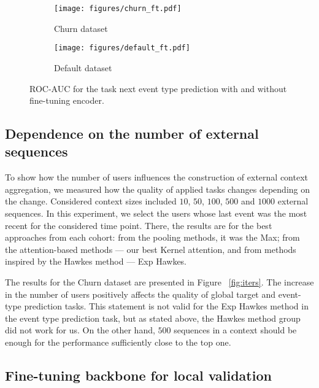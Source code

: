 

\begin{figure*}[!t]
\centering
\begin{subfigure}{.46\textwidth}
  \centering
  \texttt{[image: figures/churn\_ft.pdf]}
  \caption{Churn dataset}
  \label{fig:scatter_fgsm}
\end{subfigure}
\begin{subfigure}{.46\textwidth}
  \centering
  \texttt{[image: figures/default\_ft.pdf]}
  \caption{Default dataset}
  \label{fig:scatter_kll2}
\end{subfigure}
\caption{ROC-AUC for the task next event type prediction with and without fine-tuning encoder.}
\label{fig:fine-tune}
\end{figure*}

\subsection{Dependence on the number of external sequences}

To show how the number of users influences the construction of external context aggregation, we measured how the quality of applied tasks changes depending on the change.
Considered context sizes included $10$, $50$, $100$, $500$ and $1000$ external sequences.
In this experiment, we select the users whose last event was the most recent for the considered time point.
There, the results are for the best approaches from each cohort: from the pooling methods, it was the Max; from the attention-based methods --- our best Kernel attention, and from methods inspired by the Hawkes method --- Exp Hawkes.  

The results for the Churn dataset are presented in Figure ~\ref{fig:iters}.
The increase in the number of users positively affects the quality of global target and event-type prediction tasks. This statement is not valid for the Exp Hawkes method in the event type prediction task, but as stated above, the Hawkes method group did not work for us. 
On the other hand, $500$ sequences in a context should be enough for the performance sufficiently close to the top one.

\subsection{Fine-tuning backbone for local validation}

